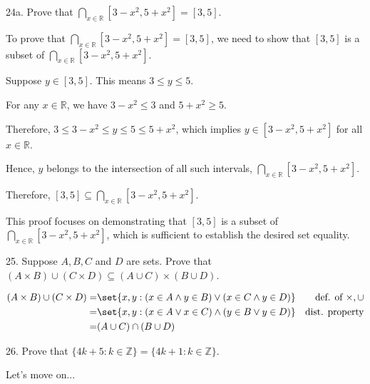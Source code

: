 \documentclass{hippoidC}
\begin{document}
\begin{prooflist}{24a. Prove that $\bigcap_{x \in \mathbb{R}}\left[3-x^2, 5+x^2\right]=[3,5]$.}
\item
To prove that $\bigcap_{x \in \mathbb{R}}\left[3-x^2, 5+x^2\right]=[3,5]$, we need to show that $[3,5]$ is a subset of $\bigcap_{x \in \mathbb{R}}\left[3-x^2, 5+x^2\right]$.

\item Suppose $y \in [3,5]$. This means $3 \leq y \leq 5$.

\item For any $x \in \mathbb{R}$, we have $3 - x^2 \leq 3$ and $5 + x^2 \geq 5$.

\item Therefore, $3 \leq 3 - x^2 \leq y \leq 5 \leq 5 + x^2$, which implies $y \in \left[3-x^2, 5+x^2\right]$ for all $x \in \mathbb{R}$.

\item Hence, $y$ belongs to the intersection of all such intervals, $\bigcap_{x \in \mathbb{R}}\left[3-x^2, 5+x^2\right]$.

\item Therefore, $[3,5] \subseteq \bigcap_{x \in \mathbb{R}}\left[3-x^2, 5+x^2\right]$.

\end{prooflist}

This proof focuses on demonstrating that $[3,5]$ is a subset of $\bigcap_{x \in \mathbb{R}}\left[3-x^2, 5+x^2\right]$, which is sufficient to establish the desired set equality.

\begin{prooflist}{25. Suppose $A, B, C$ and $D$ are sets. Prove that $(A \times
    B) \cup(C \times D) \subseteq(A \cup C) \times(B \cup D)$.} \item
\begin{align*}
    (A\times B)\cup (C\times D)=& \set{x, y: (x\in A \land y\in B) \lor (x\in C
    \land y\in D) } & \text{def. of }\times,\cup\\
    =& \set{x,y: (x\in A \lor x\in C) \land (y\in B \lor y\in D) } & \text{dist.
    property}\\
    =& (A\cup C) \cap (B\cup D)
\end{align*}
\end{prooflist}

\begin{prooflist}{26. Prove that $\{4 k+5: k \in \mathbb{Z}\}=\{4 k+1: k \in \mathbb{Z}\}$.}
\item
    Let's move on...
\end{prooflist}
\end{document}
